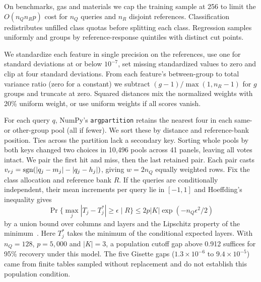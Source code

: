 On benchmarks, gas and materials we cap the training sample at 256 to limit the $O(n_Qn_Rp)$ cost for $n_Q$ queries and $n_R$ disjoint references. Classification redistributes unfilled class quotas before splitting each class. Regression samples uniformly and groups by reference-response quintiles with distinct cut points.

We standardize each feature in single precision on the references, use one for standard deviations at or below $10^{-7}$, set missing standardized values to zero and clip at four standard deviations. From each feature's between-group to total variance ratio (zero for a constant) we subtract $(g-1)/\max(1,n_R-1)$ for $g$ groups and truncate at zero. Squared distances mix the normalized weights with 20\% uniform weight, or use uniform weights if all scores vanish.

For each query $q$, NumPy's \texttt{argpartition} retains the nearest four in each same- or other-group pool (all if fewer). We sort these by distance and reference-bank position. Ties across the partition lack a secondary key. Sorting whole pools by both keys changed two choices in 10,496 pools across 41 panels, leaving all votes intact. We pair the first hit and miss, then the last retained pair. Each pair casts $v_{rj}=\operatorname{sgn}(|q_j-m_j|-|q_j-h_j|)$, giving $w=2n_Q$ equally weighted rows. Fix the class allocation and reference bank $R$. If the queries are conditionally independent, their mean increments per query lie in $[-1,1]$ and Hoeffding's inequality gives
\[
 \Pr\{\max_j|T_j-T_j^*|\ge\epsilon\mid R\}\le2p|K|\exp(-n_Q\epsilon^2/2)
\]
by a union bound over columns and layers and the Lipschitz property of the minimum~\citep{hoeffding1963}. Here $T_j^*$ takes the minimum of the conditional expected layers. With $n_Q=128$, $p=5{,}000$ and $|K|=3$, a population cutoff gap above 0.912 suffices for 95\% recovery under this model. The five Gisette gaps ($1.3\times10^{-6}$ to $9.4\times10^{-5}$) came from finite tables sampled without replacement and do not establish this population condition.
